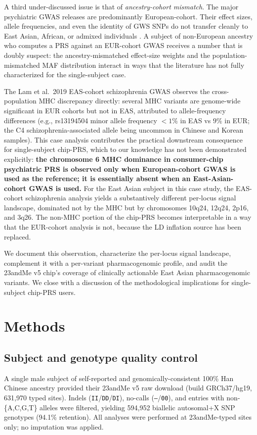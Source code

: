 \documentclass[11pt,a4paper]{article}
\begin{document}
A third under-discussed issue is that of \emph{ancestry-cohort mismatch}. The major psychiatric GWAS releases are predominantly European-cohort. Their effect sizes, allele frequencies, and even the identity of GWS SNPs do not transfer cleanly to East Asian, African, or admixed individuals \cite{martin2019}. A subject of non-European ancestry who computes a PRS against an EUR-cohort GWAS receives a number that is doubly suspect: the ancestry-mismatched effect-size weights and the population-mismatched MAF distribution interact in ways that the literature has not fully characterized for the single-subject case.

The Lam et al.~2019 EAS-cohort schizophrenia GWAS \cite{lam2019} observes the cross-population MHC discrepancy directly: several MHC variants are genome-wide significant in EUR cohorts but not in EAS, attributed to allele-frequency differences (e.g., rs13194504 minor allele frequency $<1\%$ in EAS vs $9\%$ in EUR; the C4 schizophrenia-associated allele being uncommon in Chinese and Korean samples). This case analysis contributes the practical downstream consequence for single-subject chip-PRS, which to our knowledge has not been demonstrated explicitly: \textbf{the chromosome 6 MHC dominance in consumer-chip psychiatric PRS is observed only when European-cohort GWAS is used as the reference; it is essentially absent when an East-Asian-cohort GWAS is used.} For the East Asian subject in this case study, the EAS-cohort schizophrenia analysis yields a substantively different per-locus signal landscape, dominated not by the MHC but by chromosomes 10q24, 12q24, 2p16, and 3q26. The non-MHC portion of the chip-PRS becomes interpretable in a way that the EUR-cohort analysis is not, because the LD inflation source has been replaced.

We document this observation, characterize the per-locus signal landscape, complement it with a per-variant pharmacogenomic profile, and audit the 23andMe v5 chip's coverage of clinically actionable East Asian pharmacogenomic variants. We close with a discussion of the methodological implications for single-subject chip-PRS users.

\section{Methods}

\subsection{Subject and genotype quality control}
A single male subject of self-reported and genomically-consistent 100\% Han Chinese ancestry provided their 23andMe v5 raw download (build GRCh37/hg19, 631{,}970 typed sites). Indels (\texttt{II}/\texttt{DD}/\texttt{DI}), no-calls (\texttt{--}/\texttt{00}), and entries with non-\{A,C,G,T\} alleles were filtered, yielding 594{,}952 biallelic autosomal+X SNP genotypes (94.1\% retention). All analyses were performed at 23andMe-typed sites only; no imputation was applied.
\end{document}

